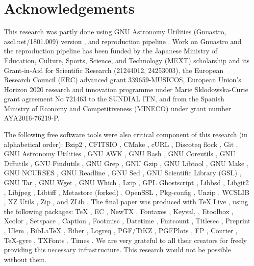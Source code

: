 \documentclass[10pt, twocolumn]{article}
\begin{document}
\section{Acknowledgements}

This research was partly done using GNU Astronomy Utilities (Gnuastro,
ascl.net/1801.009) version \gnuastroversion, and reproduction pipeline
\pipelineversion. Work on Gnuastro and the reproduction pipeline has been
funded by the Japanese Ministry of Education, Culture, Sports, Science, and
Technology (MEXT) scholarship and its Grant-in-Aid for Scientific Research
(21244012, 24253003), the European Research Council (ERC) advanced grant
339659-MUSICOS, European Union’s Horizon 2020 research and innovation
programme under Marie Sklodowska-Curie grant agreement No 721463 to the
SUNDIAL ITN, and from the Spanish Ministry of Economy and Competitiveness
(MINECO) under grant number AYA2016-76219-P.

The following free software tools were also critical component of this
research (in alphabetical order): Bzip2 \bziptwoversion, CFITSIO
\cfitsioversion, CMake \cmakeversion, cURL \curlversion, Discoteq flock
\flockversion, Git \gitversion, GNU Astronomy Utilities \gnuastroversion,
GNU AWK \gawkversion, GNU Bash \bashversion, GNU Coreutils
\coreutilsversion, GNU Diffutils \diffutilsversion, GNU Findutils
\findutilsversion, GNU Grep \grepversion, GNU Gzip \gzipversion, GNU
Libtool \libtoolversion, GNU Make \makeversion, GNU NCURSES
\ncursesversion, GNU Readline \readlineversion, GNU Sed \sedversion, GNU
Scientific Library (GSL) \gslversion, GNU Tar \tarversion, GNU Wget
\wgetversion, GNU Which \whichversion, Lzip \lzipversion, GPL Ghostscript
\ghostscriptversion, Libbsd \libbsdversion, Libgit2 \libgitwoversion,
Libjpeg \libjpegversion, Libtiff \libtiffversion, Metastore (forked)
\metastoreversion, OpenSSL \opensslversion, Pkg-config \pkgconfigversion,
Unzip \unzipversion, WCSLIB \wcslibversion, XZ Utils \xzversion, Zip
\zipversion, and ZLib \zlibversion. The final paper was produced with
\TeX{} Live \texliveversion, using the following packages: \TeX{}
\textexversion, EC \texecversion, NewTX \texnewtxversion, Fontaxes
\texfontaxesversion, Keyval, \texxkeyvalversion, Etoolbox
\texetoolboxversion, Xcolor \texxcolorversion, Setspace
\texsetspaceversion, Caption \texcaptionversion, Footmisc
\texfootmiscversion, Datetime \texdatetimeversion, Fmtcount
\texfmtcountversion, Titlesec \textitlesecversion, Preprint
\texpreprintversion, Ulem \texulemversion, Bib\LaTeX{} \texbiblatexversion,
Biber \texbiberversion, Logreq \texlogreqversion, PGF/TiKZ \texpgfversion,
PGFPlots \texpgfplotsversion, FP \texfpversion, Courier \texcourierversion,
\TeX-gyre \textexgyreversion, TXFonts \textxfontsversion, Times
\textimesversion. We are very grateful to all their creators for freely
providing this necessary infrastructure. This research would not be
possible without them.

\printbibliography

\end{document}
